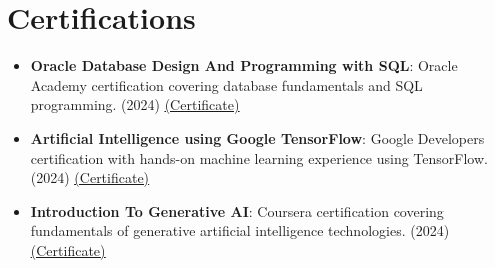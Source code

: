 \documentclass[a4paper,20pt]{article}
\newcommand{\resumeItem}[2]{
  \item\small{
    \textbf{#1}{: #2 \vspace{-2pt}}
  }
}
\newcommand{\resumeSubItem}[2]{\resumeItem{#1}{#2}\vspace{-3pt}}
\newcommand{\resumeSubHeadingListStart}{\begin{itemize}[leftmargin=*]}
\newcommand{\resumeSubHeadingListEnd}{\end{itemize}}
\begin{document}
\section{Certifications}
\resumeSubHeadingListStart
\resumeSubItem{Oracle Database Design And Programming with SQL}{Oracle Academy certification covering database fundamentals and SQL programming. (2024) \href{https://drive.google.com/file/d/1YfW9d_pYAyF3RT0W7gQLNJl4bS2JllE1/view?usp=sharing}{\underline{(Certificate)}}}
\vspace{2pt}
\resumeSubItem{Artificial Intelligence using Google TensorFlow}{Google Developers certification with hands-on machine learning experience using TensorFlow. (2024) \href{https://drive.google.com/file/d/1sZB1E2ebCJzceL3Nt5oHN3k5Fzc4sUXF/view?usp=sharing}{\underline{(Certificate)}}}
\vspace{2pt}
\resumeSubItem{Introduction To Generative AI}{Coursera certification covering fundamentals of generative artificial intelligence technologies. (2024) \href{https://drive.google.com/file/d/1MuiPSeWWfEdywAhrKDjijeDhyDbbqgJO/view?usp=sharing}{\underline{(Certificate)}}}
\resumeSubHeadingListEnd
\end{document}
